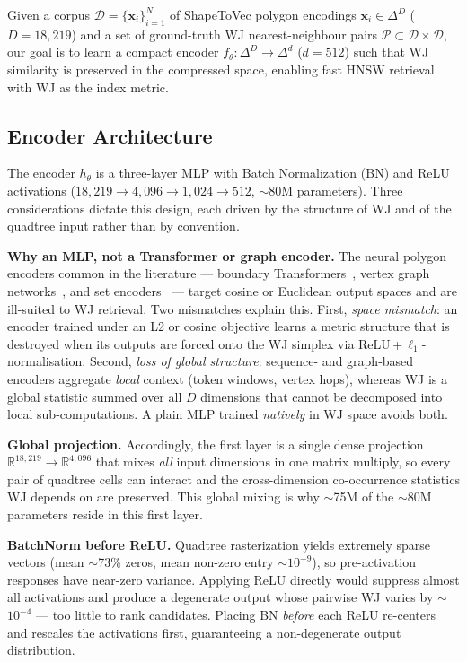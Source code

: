 \documentclass[sigconf]{acmart}
\begin{document}
Given a corpus $\mathcal{D} = \{\mathbf{x}_i\}_{i=1}^N$ of ShapeToVec polygon
encodings $\mathbf{x}_i \in \Delta^D$ ($D = 18{,}219$) and a set of ground-truth
WJ nearest-neighbour pairs $\mathcal{P} \subset \mathcal{D} \times \mathcal{D}$,
our goal is to learn a compact encoder $f_\theta: \Delta^D \to \Delta^d$ ($d = 512$)
such that WJ similarity is preserved in the compressed space, enabling fast HNSW
retrieval with WJ as the index metric.

\subsection{Encoder Architecture}
\label{sec:arch}

The encoder $h_\theta$ is a three-layer MLP with Batch Normalization (BN) and
ReLU activations ($18{,}219 \to 4{,}096 \to 1{,}024 \to 512$, $\sim$80M
parameters). Three considerations dictate this design, each driven by the
structure of WJ and of the quadtree input rather than by convention.

\noindent\textbf{Why an MLP, not a Transformer or graph encoder.}
The neural polygon encoders common in the literature --- boundary
Transformers~\cite{mai22}, vertex graph networks~\cite{polygongnn24}, and set
encoders~\cite{deepsets17} --- target cosine or Euclidean output spaces and are
ill-suited to WJ retrieval. Two mismatches explain this. First,
\emph{space mismatch}: an encoder trained under an L2 or cosine objective learns
a metric structure that is destroyed when its outputs are forced onto the WJ
simplex via ReLU\,+\,$\ell_1$-normalisation. Second, \emph{loss of global
structure}: sequence- and graph-based encoders aggregate \emph{local} context
(token windows, vertex hops), whereas WJ is a global statistic summed over all
$D$ dimensions that cannot be decomposed into local sub-computations. A plain
MLP trained \emph{natively} in WJ space avoids both.

\noindent\textbf{Global projection.}
Accordingly, the first layer is a single dense projection
$\mathbb{R}^{18{,}219}\!\to\!\mathbb{R}^{4{,}096}$ that mixes \emph{all} input
dimensions in one matrix multiply, so every pair of quadtree cells can interact
and the cross-dimension co-occurrence statistics WJ depends on are preserved.
This global mixing is why $\sim$75M of the $\sim$80M parameters reside in this
first layer.

\noindent\textbf{BatchNorm before ReLU.}
Quadtree rasterization yields extremely sparse vectors (mean $\sim$73\% zeros,
mean non-zero entry $\sim$$10^{-9}$), so pre-activation responses have near-zero
variance. Applying ReLU directly would suppress almost all activations and
produce a degenerate output whose pairwise WJ varies by $\sim$$10^{-4}$ --- too
little to rank candidates. Placing BN \emph{before} each ReLU re-centers and
rescales the activations first, guaranteeing a non-degenerate output distribution.
\end{document}
